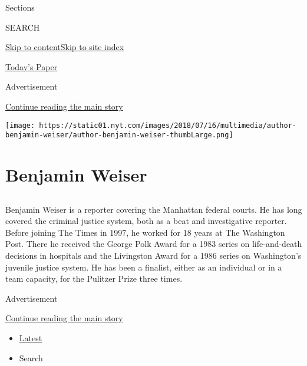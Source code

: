 Sections

SEARCH

\protect\hyperlink{site-content}{Skip to
content}\protect\hyperlink{site-index}{Skip to site index}

\href{https://myaccount.nytimes.com/auth/login?response_type=cookie\&client_id=vi}{}

\href{https://www.nytimes.com/section/todayspaper}{Today's Paper}

Advertisement

\protect\hyperlink{after-top}{Continue reading the main story}

\texttt{[image: https://static01.nyt.com/images/2018/07/16/multimedia/author-benjamin-weiser/author-benjamin-weiser-thumbLarge.png]}

\hypertarget{benjamin-weiser}{%
\section{Benjamin Weiser}\label{benjamin-weiser}}

\subsection{}

Benjamin Weiser is a reporter covering the Manhattan federal courts. He
has long covered the criminal justice system, both as a beat and
investigative reporter. Before joining The Times in 1997, he worked for
18 years at The Washington Post. There he received the George Polk Award
for a 1983 series on life-and-death decisions in hospitals and the
Livingston Award for a 1986 series on Washington's juvenile justice
system. He has been a finalist, either as an individual or in a team
capacity, for the Pulitzer Prize three times.

Advertisement

\protect\hyperlink{after-mid1}{Continue reading the main story}

\begin{itemize}
\tightlist
\item
  \protect\hyperlink{stream-panel}{Latest}
\item
  Search
\end{itemize}

